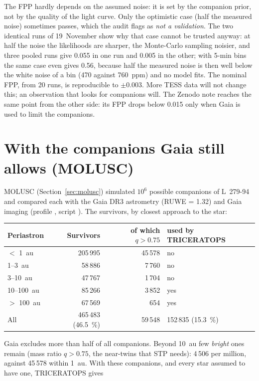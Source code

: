 The FPP hardly depends on the assumed noise: it is set by the companion
prior, not by the quality of the light curve. Only the optimistic case
(half the measured noise) sometimes passes, which the audit flags as
\emph{not a validation}. The two identical runs of 19~November show why
that case cannot be trusted anyway: at half the noise the likelihoods are
sharper, the Monte-Carlo sampling noisier, and three pooled runs give 0.055
in one run and 0.005 in the other; with 5-min bins the same case even gives
0.56, because half the measured noise is then well below the white noise of
a bin (470 against 760~ppm) and no model fits. The nominal FPP, from 20 runs, is
reproducible to $\pm0.003$. More TESS data will not change this; an observation that
looks for companions will. The Zenodo note reaches the same point from the
other side: its FPP drops below 0.015 only when Gaia is used to limit the
companions.

\section*{With the companions Gaia still allows (MOLUSC)}

MOLUSC (Section~\ref{sec:molusc}) simulated $10^6$ possible companions of
L~279-94 and compared each with the Gaia DR3 astrometry (RUWE = 1.32) and
Gaia imaging (profile , script
). The survivors, by closest approach
to the star:

\begin{center}
\begin{tabular}{@{}lrrl@{}}
\toprule
Periastron & Survivors & of which $q > 0.75$ & used by TRICERATOPS\\
\midrule
$<$ 1~au & 205\,995 & 45\,578 & no\\
1--3~au & 58\,886 & 7\,760 & no\\
3--10~au & 47\,767 & 1\,704 & no\\
10--100~au & 85\,266 & 3\,852 & yes\\
$>$ 100~au & 67\,569 & 654 & yes\\
\midrule
All & 465\,483 (46.5~\%) & 59\,548 & 152\,835 (15.3~\%)\\
\bottomrule
\end{tabular}
\end{center}

Gaia excludes more than half of all companions. Beyond 10~au few
\emph{bright} ones remain (mass ratio $q > 0.75$, the near-twins that STP
needs): 4\,506 per million, against 45\,578 within 1~au. With these companions, and every star assumed to have one,
TRICERATOPS gives

